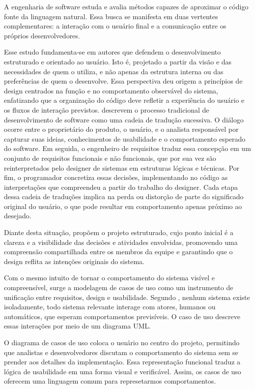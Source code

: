 \documentclass[12pt,a4paper]{article}
\begin{document}
A engenharia de software estuda e avalia métodos capazes de aproximar o código fonte da linguagem natural. Essa busca se manifesta em duas vertentes complementares: a interação com o usuário final e a comunicação entre os próprios desenvolvedores.

Esse estudo fundamenta-se em autores que defendem o desenvolvimento estruturado e orientado ao usuário. Isto é, projetado a partir da visão e das necessidades de quem o utiliza, e não apenas da estrutura interna ou das preferências de quem o desenvolve. Essa perspectiva deu origem a princípios de design centrados na função e no comportamento observável do sistema, enfatizando que a organização do código deve refletir a experiência do usuário e os fluxos de interação previstos. \textcite{yourdon1979structured} descrevem o processo tradicional de desenvolvimento de software como uma cadeia de tradução sucessiva. O diálogo ocorre entre o proprietário do produto, o usuário, e o analista responsável por capturar suas ideias, conhecimentos de usabilidade e o comportamento esperado do software. Em seguida, o engenheiro de requisitos traduz essa concepção em um conjunto de requisitos funcionais e não funcionais, que por sua vez são reinterpretados pelo designer de sistemas em estruturas lógicas e técnicas. Por fim, o programador concretiza essas decisões, implementando no código as interpretações que compreendeu a partir do trabalho do designer. Cada etapa dessa cadeia de traduções implica na perda ou distorção de parte do significado original do usuário, o que pode resultar em comportamento apenas próximo ao desejado.

Diante desta situação, \textcite{yourdon1979structured} propõem o projeto estruturado, cujo ponto inicial é a clareza e a visibilidade das decisões e atividades envolvidas, promovendo uma compreensão compartilhada entre os membros da equipe e garantindo que o design reflita as intenções originais do sistema.

Com o mesmo intuito de tornar o comportamento do sistema visível e compreensível, surge a modelagem de casos de uso como um instrumento de unificação entre requisitos, design e usabilidade. Segundo \textcite{booch1999unified}, nenhum sistema existe isoladamente, todo sistema relevante interage com atores, humanos ou automáticos, que esperam comportamentos previsíveis. O caso de uso descreve essas interações por meio de um diagrama UML.

O diagrama de casos de uso coloca o usuário no centro do projeto, permitindo que analistas e desenvolvedores discutam o comportamento do sistema sem se prender aos detalhes da implementação. Essa representação funcional traduz a lógica de usabilidade em uma forma visual e verificável. Assim, os casos de uso oferecem uma linguagem comum para represetarmos comportamentos.
\end{document}
